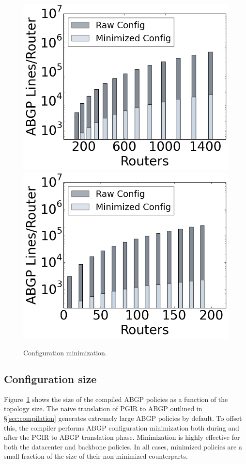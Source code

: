\documentclass[10pt]{sigalternate052015}
\begin{document}
\begin{figure}[t!]
    {\includegraphics[width=.49\columnwidth]{figures/config-compression-dc.png}}
    {\includegraphics[width=.49\columnwidth]{figures/config-compression-backbone.png}} \\
  \caption{Configuration minimization. \label{fig:config-min}}
  \vspace{-1em}
\end{figure}

\subsection{Configuration size}

Figure~\ref{fig:config-min} shows the size of the compiled ABGP policies as a function of the topology size. The naive translation of PGIR to ABGP outlined in \S\ref{sec:compilation} generates extremely large ABGP policies by default. To offset this, the compiler performs ABGP configuration minimization both during and after the PGIR to ABGP translation phase.
Minimization is highly effective for both the datacenter and backbone policies. In all cases, minimized policies are a small fraction of the size of their non-minimized counterparts.
\end{document}
